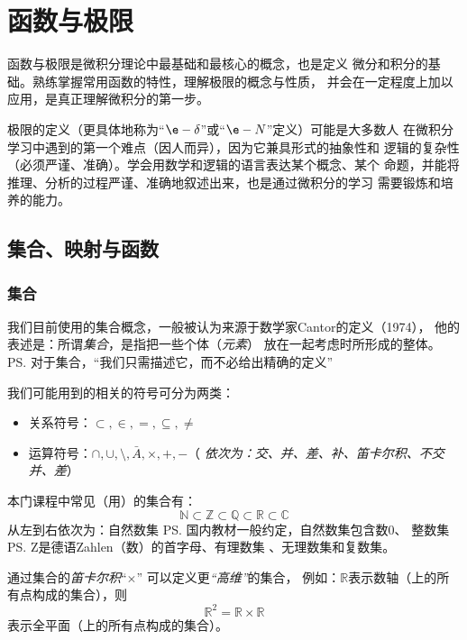 
\setcounter{theExample}{1}
\setcounter{chapter}{0}

\chapter{函数与极限}

函数与极限是微积分理论中最基础和最核心的概念，也是定义
微分和积分的基础。熟练掌握常用函数的特性，理解极限的概念与性质，
并会在一定程度上加以应用，是真正理解微积分的第一步。

极限的定义（更具体地称为“$\e-\delta$”或“$\e-N$”定义）可能是大多数人
在微积分学习中遇到的第一个难点（因人而异），因为它兼具形式的抽象性和
逻辑的复杂性（必须严谨、准确）。学会用数学和逻辑的语言表达某个概念、某个
命题，并能将推理、分析的过程严谨、准确地叙述出来，也是通过微积分的学习
需要锻炼和培养的能力。

\section{集合、映射与函数}

\subsection{集合}

我们目前使用的集合概念，一般被认为来源于数学家Cantor的定义（1974），
他的表述是：所谓{\it 集合}，是指把一些个体（{\it 元素}） 
放在一起考虑时所形成的整体。
\ps{对于集合，“我们只需描述它，而不必给出精确的定义”}

我们可能用到的相关的符号可分为两类：
\begin{itemize}
  \item 关系符号：$\subset, \in, =, \subseteq, \neq$
  \item 运算符号：$\cap,\cup, \setminus, \bar{A}, \times, +, - $\quad （{\it
  依次为：交、并、差、补、笛卡尔积、不交并、差}）
\end{itemize}
	
本门课程中常见（用）的集合有：
$$\mathbb{N}\subset\mathbb{Z}\subset\mathbb{Q}
\subset\mathbb{R}\subset\mathbb{C}$$
从左到右依次为：{\kaishu 自然数集}
\ps{\vspace{-1cm}国内教材一般约定，自然数集包含数$0$}、
{\kaishu 整数集}\ps{Z是德语Zahlen（数）的首字母}、{\kaishu 有理数集}
、{\kaishu 无理数集}和{\kaishu 复数集}。

通过集合的{\it 笛卡尔积}“$\times$” 可以定义更{\it“高维”}的集合，
例如：$\mathbb{R}$表示数轴（上的所有点构成的集合），则
$$\mathbb{R}^2=\mathbb{R}\times\mathbb{R}$$
表示全平面（上的所有点构成的集合）。

